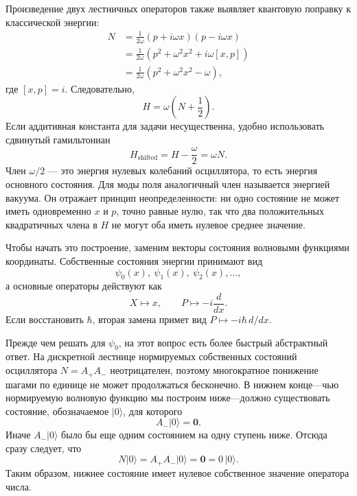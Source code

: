 Произведение двух лестничных операторов также выявляет квантовую поправку к классической энергии:
\begin{align}
N
&=\frac{1}{2\omega}(p+i\omega x)(p-i\omega x)\\
&=\frac{1}{2\omega}\left(p^{2}+\omega^{2}x^{2}
 +i\omega[x,p]\right)\\
&=\frac{1}{2\omega}\left(p^{2}+\omega^{2}x^{2}-\omega\right),
\end{align}
где \([x,p]=i\). Следовательно,
\begin{equation}
H=\omega\left(N+\frac12\right).
\end{equation}
Если аддитивная константа для задачи несущественна, удобно использовать сдвинутый гамильтониан
\begin{equation}
H_{\mathrm{shifted}}=H-\frac{\omega}{2}=\omega N.
\end{equation}
Член \(\omega/2\) — это энергия нулевых колебаний осциллятора, то есть энергия основного состояния. Для моды поля аналогичный член называется энергией вакуума. Он отражает принцип неопределенности: ни одно состояние не может иметь одновременно \(x\) и \(p\), точно равные нулю, так что два положительных квадратичных члена в \(H\) не могут оба иметь нулевое среднее значение.

\begin{classroomqa}
\end{classroomqa}

Чтобы начать это построение, заменим векторы состояния волновыми функциями координаты. Собственные состояния энергии принимают вид
\[
\psi_{0}(x),\ \psi_{1}(x),\ \psi_{2}(x),\ldots,
\]
а основные операторы действуют как
\begin{equation}
X\longmapsto x,\qquad
P\longmapsto -i\frac{d}{dx}.
\end{equation}
Если восстановить \(\hbar\), вторая замена примет вид
\(P\mapsto-i\hbar\,d/dx\).

Прежде чем решать для \(\psi_{0}\), на этот вопрос есть более быстрый абстрактный ответ. На дискретной лестнице нормируемых собственных состояний осциллятора \(N=A_{+}A_{-}\) неотрицателен, поэтому многократное понижение шагами по единице не может продолжаться бесконечно. В нижнем конце---чью нормируемую волновую функцию мы построим ниже---должно существовать состояние, обозначаемое \(\lvert0\rangle\), для которого
\begin{equation}
A_{-}\lvert0\rangle=\mathbf 0.
\end{equation}
Иначе \(A_{-}\lvert0\rangle\) было бы еще одним состоянием на одну ступень ниже. Отсюда сразу следует, что
\begin{equation}
N\lvert0\rangle
=A_{+}A_{-}\lvert0\rangle
=\mathbf 0
=0\,\lvert0\rangle.
\end{equation}
Таким образом, нижнее состояние имеет нулевое собственное значение оператора числа.

